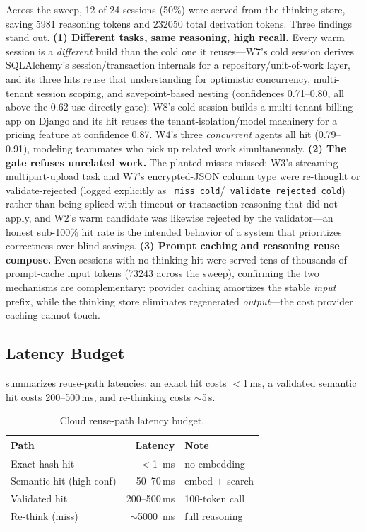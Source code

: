 \documentclass[10pt]{article}
\begin{document}
Across the sweep, 12 of 24 sessions (50\%) were served from the thinking
store, saving \num{5981} reasoning tokens and \num{232050} total derivation
tokens. Three findings stand out. \textbf{(1) Different tasks, same reasoning,
high recall.} Every warm session is a \emph{different} build than the cold one
it reuses---W7's cold session derives SQLAlchemy's session/transaction
internals for a repository/unit-of-work layer, and its three hits reuse that
understanding for optimistic concurrency, multi-tenant session scoping, and
savepoint-based nesting (confidences 0.71--0.80, all above the 0.62
use-directly gate); W8's cold session builds a multi-tenant billing app on
Django and its hit reuses the tenant-isolation/model machinery for a pricing
feature at confidence 0.87. W4's three \emph{concurrent} agents all hit
(0.79--0.91), modeling teammates who pick up related work simultaneously.
\textbf{(2) The gate refuses unrelated work.} The planted misses missed: W3's
streaming-multipart-upload task and W7's encrypted-JSON column type were
re-thought or validate-rejected (logged explicitly as
\texttt{\_miss\_cold}/\texttt{\_validate\_rejected\_cold}) rather than being
spliced with timeout or transaction reasoning that did not apply, and W2's
warm candidate was likewise rejected by the validator---an honest sub-100\%
hit rate is the intended behavior of a system that prioritizes correctness
over blind savings. \textbf{(3) Prompt caching and reasoning reuse compose.}
Even sessions with no thinking hit were served tens of thousands of
prompt-cache input tokens (\num{73243} across the sweep), confirming the two
mechanisms are complementary: provider caching amortizes the stable
\emph{input} prefix, while the thinking store eliminates regenerated
\emph{output}---the cost provider caching cannot touch.

\subsection{Latency Budget}
 summarizes reuse-path latencies: an exact hit costs $<$1\,ms,
a validated semantic hit costs 200--500\,ms, and re-thinking costs $\sim$5\,s.

\begin{table}[t]
\centering
\caption{Cloud reuse-path latency budget.}
\label{tab:latency}
\small
\begin{tabular}{lrl}
\toprule
\textbf{Path} & \textbf{Latency} & \textbf{Note} \\
\midrule
Exact hash hit          & $<$\SI{1}{\milli\second}    & no embedding \\
Semantic hit (high conf) & 50--70\,ms      & embed $+$ search \\
Validated hit            & 200--500\,ms    & 100-token call \\
Re-think (miss)          & $\sim$\SI{5000}{\milli\second} & full reasoning \\
\bottomrule
\end{tabular}
\end{table}
\end{document}
